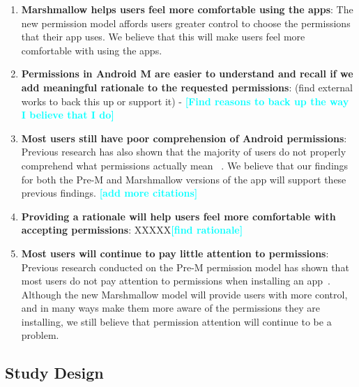 \documentclass{sig-alternate-05-2015}
\newcommand{\todo}[1]{\textcolor{cyan}{\textbf{[#1]}}}
\begin{document}
\begin{enumerate}
 \setlength{\itemsep}{.8pt} 
    \setlength{\parskip}{0pt} 
    \setlength{\parsep}{0pt}  



	\item \textbf{Marshmallow helps users feel more comfortable using the apps}:  The new permission model affords users greater control to choose the permissions that their app uses. We believe that this will make users feel more comfortable with using the apps.
	\item \textbf{ Permissions in Android M are easier to understand and recall if we add meaningful rationale to the requested permissions}:  (find external works to back this up or support it) - \todo{Find reasons to back up the way I believe that I do}
	\item \textbf{Most users still have poor comprehension of Android permissions}:  Previous research has also shown that the majority of users do not properly comprehend what permissions actually mean ~\cite{Felt:2012:APU:2335356.2335360}. We believe that our findings for both the Pre-M and Marshmallow versions of the app will support these previous findings. \todo{add more citations}
	\item \textbf{Providing a rationale will help users feel more comfortable with accepting permissions}:  XXXXX\todo{find rationale}
	\item \textbf{Most users will continue to pay little attention to permissions}:  Previous research conducted on the Pre-M permission model has shown that most users do not pay attention to permissions when installing an app~\cite{Felt:2012:APU:2335356.2335360}. Although the new Marshmallow model will provide users with more control, and in many ways make them more aware of the permissions they are installing, we still believe that permission attention will continue to be a problem.

\end{enumerate}






\subsection{Study Design}
\end{document}

